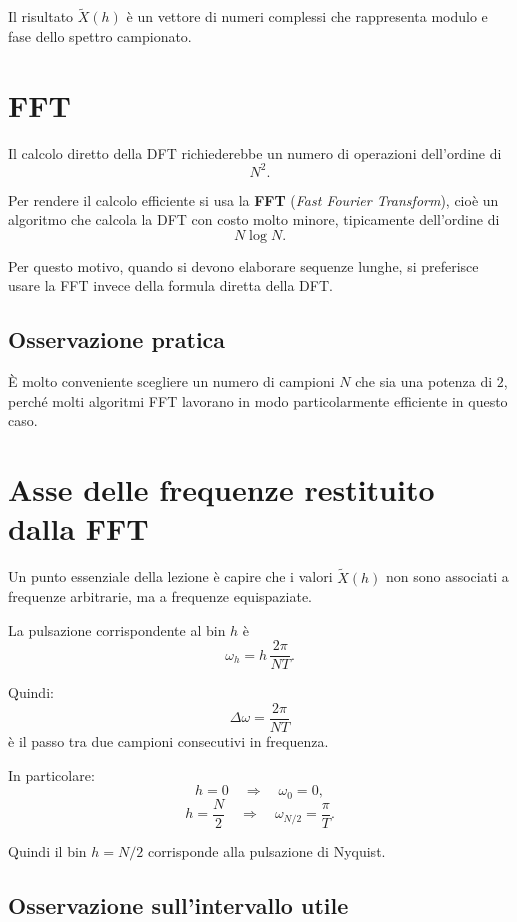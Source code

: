 Il risultato \(\tilde X(h)\) è un vettore di numeri complessi che rappresenta modulo e fase
dello spettro campionato.

\section{FFT}

Il calcolo diretto della DFT richiederebbe un numero di operazioni dell'ordine di
\[
N^2.
\]

Per rendere il calcolo efficiente si usa la \textbf{FFT} (\emph{Fast Fourier Transform}),
cioè un algoritmo che calcola la DFT con costo molto minore, tipicamente dell'ordine di
\[
N\log N.
\]

Per questo motivo, quando si devono elaborare sequenze lunghe,
si preferisce usare la FFT invece della formula diretta della DFT.

\subsection*{Osservazione pratica}

È molto conveniente scegliere un numero di campioni \(N\) che sia una potenza di \(2\),
perché molti algoritmi FFT lavorano in modo particolarmente efficiente in questo caso.

\section{Asse delle frequenze restituito dalla FFT}

Un punto essenziale della lezione è capire che i valori \(\tilde X(h)\)
non sono associati a frequenze arbitrarie, ma a frequenze equispaziate.

La pulsazione corrispondente al bin \(h\) è
\[
\omega_h = h\,\frac{2\pi}{NT}.
\]

Quindi:
\[
\Delta\omega = \frac{2\pi}{NT}
\]
è il passo tra due campioni consecutivi in frequenza.

In particolare:
\[
h=0 \quad \Longrightarrow \quad \omega_0=0,
\]
\[
h=\frac{N}{2} \quad \Longrightarrow \quad \omega_{N/2}=\frac{\pi}{T}.
\]

Quindi il bin \(h=N/2\) corrisponde alla pulsazione di Nyquist.

\subsection*{Osservazione sull'intervallo utile}

